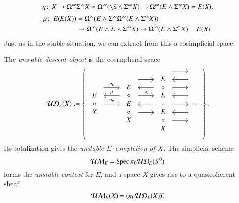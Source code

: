 \[\eta\co X \to \Loops^\infty \Susp^\infty X \simeq \Loops^\infty (\S \sm \Susp^\infty X) \to \Loops^\infty (E \sm \Susp^\infty X) = E(X),\]
\begin{align*}
\mu\colon\thinspace E(E(X)) & = \Omega^\infty(E \wedge \Sigma^\infty\Omega^\infty(E \wedge \Sigma^\infty X)) \\
& \to \Omega^\infty(E \wedge E \wedge \Sigma^\infty X) \to \Omega^\infty(E \wedge \Sigma^\infty X) = E(X).
\end{align*}
Just as in the stable situation, we can extract from this a cosimplicial space:
\begin{definition}
The \textit{unstable descent object} is the cosimplicial space
\[\sheaf{UD}_E(X) := \left\{
\begin{tikzcd}
\begin{array}{c} E \\ \circ \\ X \end{array} \arrow[leftarrow, shift left=\baselineskip]{r}{\mu} \arrow[shift left=(2*\baselineskip)]{r}{\eta_L} \arrow{r}{\eta_R} &
\begin{array}{c} E \\ \circ \\ E \\ \circ \\ X \end{array} \arrow[shift left=(3*\baselineskip)]{r} \arrow[leftarrow, shift left=(2*\baselineskip)]{r} \arrow[shift left=\baselineskip]{r}{\Delta} \arrow[leftarrow]{r} \arrow[shift right=\baselineskip]{r} &
\begin{array}{c} E \\ \circ \\ E \\ \circ \\ E \\ \circ \\ X \end{array} \arrow[shift left=(4*\baselineskip)]{r} \arrow[leftarrow, shift left=(3*\baselineskip)]{r} \arrow[shift left=(2*\baselineskip)]{r} \arrow[leftarrow, shift left=\baselineskip]{r} \arrow{r} \arrow[leftarrow, shift right=\baselineskip]{r} \arrow[shift right=(2*\baselineskip)]{r} &
\cdots
\end{tikzcd}
\right\}.\]
Its totalization gives the \textit{unstable $E$--completion of $X$}.  The simplicial scheme \[\mathcal{UM}_{E} = \operatorname{Spec} \pi_0 \mathcal{UD}_E(S^0)\] forms the \textit{unstable context} for $E$, and a space $X$ gives rise to a quasicoherent sheaf \[\mathcal{UM}_{E}(X) = (\pi_0 \mathcal{UD}_E(X))\widetilde{}.\]
\end{definition}

